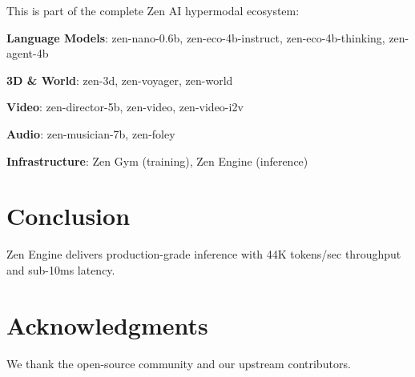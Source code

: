 \documentclass[11pt,a4paper]{article}
\begin{document}
This is part of the complete Zen AI hypermodal ecosystem:

\textbf{Language Models}: zen-nano-0.6b, zen-eco-4b-instruct, zen-eco-4b-thinking, zen-agent-4b

\textbf{3D \& World}: zen-3d, zen-voyager, zen-world

\textbf{Video}: zen-director-5b, zen-video, zen-video-i2v

\textbf{Audio}: zen-musician-7b, zen-foley

\textbf{Infrastructure}: Zen Gym (training), Zen Engine (inference)

\section{Conclusion}
Zen Engine delivers production-grade inference with 44K tokens/sec throughput and sub-10ms latency.

\section*{Acknowledgments}
We thank the open-source community and our upstream contributors.



\end{document}
